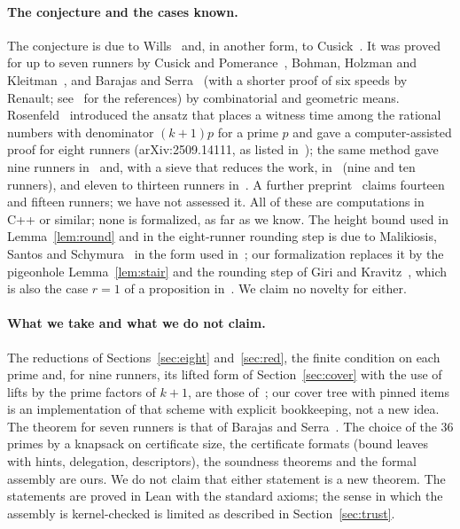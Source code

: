 \documentclass[11pt]{article}
\theoremstyle{remark}
\begin{document}
\paragraph{The conjecture and the cases known.} The conjecture is due to Wills~\cite{Wills} and, in another form, to Cusick~\cite{Cusick}. It was proved for up to seven runners by Cusick and Pomerance~\cite{CP}, Bohman, Holzman and Kleitman~\cite{BHK}, and Barajas and Serra~\cite{BS} (with a shorter proof of six speeds by Renault; see~\cite{ST} for the references) by combinatorial and geometric means. Rosenfeld~\cite{Ros8} introduced the ansatz that places a witness time among the rational numbers with denominator $(k+1)p$ for a prime $p$ and gave a computer-assisted proof for eight runners (arXiv:2509.14111, as listed in~\cite{Ros8}); the same method gave nine runners in~\cite{Ros9} and, with a sieve that reduces the work, in~\cite{Tra} (nine and ten runners), and eleven to thirteen runners in~\cite{ST}. A further preprint~\cite{All} claims fourteen and fifteen runners; we have not assessed it. All of these are computations in C++ or similar; none is formalized, as far as we know. The height bound used in Lemma~\ref{lem:round} and in the eight-runner rounding step is due to Malikiosis, Santos and Schymura~\cite{MSS} in the form used in~\cite{Ros8}; our formalization replaces it by the pigeonhole Lemma~\ref{lem:stair} and the rounding step of Giri and Kravitz~\cite{GK}, which is also the case $r=1$ of a proposition in~\cite{All}. We claim no novelty for either.

\paragraph{What we take and what we do not claim.} The reductions of Sections~\ref{sec:eight} and~\ref{sec:red}, the finite condition on each prime and, for nine runners, its lifted form of Section~\ref{sec:cover} with the use of lifts by the prime factors of $k+1$, are those of~\cite{Ros8,Ros9,Tra,ST}; our cover tree with pinned items is an implementation of that scheme with explicit bookkeeping, not a new idea. The theorem for seven runners is that of Barajas and Serra~\cite{BS}. The choice of the $36$ primes by a knapsack on certificate size, the certificate formats (bound leaves with hints, delegation, descriptors), the soundness theorems and the formal assembly are ours. We do not claim that either statement is a new theorem. The statements are proved in Lean with the standard axioms; the sense in which the assembly is kernel-checked is limited as described in Section~\ref{sec:trust}.
\end{document}
